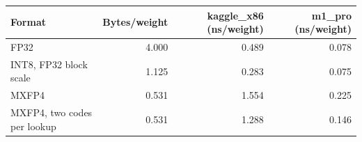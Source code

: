 \begin{tabular}{lrrr}
\toprule
Format & Bytes/weight & kaggle\_x86 (ns/weight) & m1\_pro (ns/weight) \\
\midrule
FP32 & 4.000 & 0.489 & 0.078 \\
INT8, FP32 block scale & 1.125 & 0.283 & 0.075 \\
MXFP4 & 0.531 & 1.554 & 0.225 \\
MXFP4, two codes per lookup & 0.531 & 1.288 & 0.146 \\
\bottomrule
\end{tabular}
